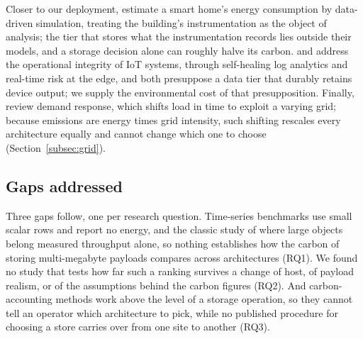 \documentclass[pdflatex,sn-basic]{sn-jnl}%
\begin{document}
Closer to our deployment, \citet{adams_smart_home_energy} estimate a smart home's energy consumption by data-driven simulation, treating the building's instrumentation as the object of analysis; the tier that stores what the instrumentation records lies outside their models, and a storage decision alone can roughly halve its carbon. \citet{singh_iot_self_healing} and \citet{radanliev_iot_edge_risk} address the operational integrity of IoT systems, through self-healing log analytics and real-time risk at the edge, and both presuppose a data tier that durably retains device output; we supply the environmental cost of that presupposition. Finally, \citet{alessa_demand_response_review} review demand response, which shifts load in time to exploit a varying grid; because emissions are energy times grid intensity, such shifting rescales every architecture equally and cannot change which one to choose (Section~\ref{subsec:grid}).

\subsection{Gaps addressed}\label{subsec:gaps}
Three gaps follow, one per research question. Time-series benchmarks use small scalar rows and report no energy, and the classic study of where large objects belong measured throughput alone, so nothing establishes how the carbon of storing multi-megabyte payloads compares across architectures (RQ1). We found no study that tests how far such a ranking survives a change of host, of payload realism, or of the assumptions behind the carbon figures (RQ2). And carbon-accounting methods work above the level of a storage operation, so they cannot tell an operator which architecture to pick, while no published procedure for choosing a store carries over from one site to another (RQ3).
\end{document}
